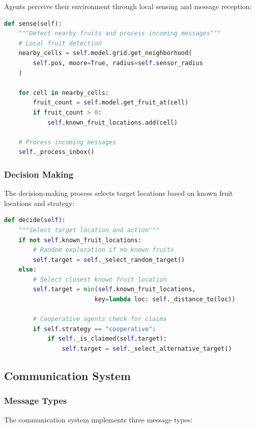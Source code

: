 \documentclass[12pt,a4paper]{article}
\begin{document}
Agents perceive their environment through local sensing and message reception:

\begin{lstlisting}[language=Python, caption=Agent Sensing Implementation]
def sense(self):
    """Detect nearby fruits and process incoming messages"""
    # Local fruit detection
    nearby_cells = self.model.grid.get_neighborhood(
        self.pos, moore=True, radius=self.sensor_radius
    )

    for cell in nearby_cells:
        fruit_count = self.model.get_fruit_at(cell)
        if fruit_count > 0:
            self.known_fruit_locations.add(cell)

    # Process incoming messages
    self._process_inbox()
\end{lstlisting}

\subsubsection{Decision Making}

The decision-making process selects target locations based on known fruit locations and strategy:

\begin{lstlisting}[language=Python, caption=Agent Decision Making]
def decide(self):
    """Select target location and action"""
    if not self.known_fruit_locations:
        # Random exploration if no known fruits
        self.target = self._select_random_target()
    else:
        # Select closest known fruit location
        self.target = min(self.known_fruit_locations,
                         key=lambda loc: self._distance_to(loc))

        # Cooperative agents check for claims
        if self.strategy == "cooperative":
            if self._is_claimed(self.target):
                self.target = self._select_alternative_target()
\end{lstlisting}

\subsection{Communication System}

\subsubsection{Message Types}

The communication system implements three message types:
\end{document}
